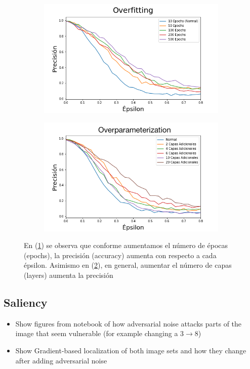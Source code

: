 \begin{figure}[h]
    \centering
    \begin{subfigure}[b]{0.49\textwidth}
        \centering
        \includegraphics[width=\textwidth]{images/overfit_vs_attack.png}
        \caption{}
        \label{overfit}
    \end{subfigure}
    \begin{subfigure}[b]{0.49\textwidth}
        \centering
        \includegraphics[width=\textwidth]{images/overparam_vs_attack.png}
        \caption{}
        \label{overparam}
    \end{subfigure}
    \caption{En (\ref{overfit}) se observa que conforme aumentamos el número de épocas (epochs), la precisión (accuracy) aumenta con respecto a cada épsilon. Asimismo en (\ref{overparam}), en general, aumentar el número de capas (layers) aumenta la precisión}
    \label{overaparam_overfit}
\end{figure}

\pagebreak
    
\subsection{Saliency}
\begin{itemize}
    \item Show figures from notebook of how adversarial noise attacks parts of the image that seem vulnerable (for example changing a 3$\to$8)
    \item Show Gradient-based localization of both image sets and how they change after adding adversarial noise\cite{Selvaraju_2019}
\end{itemize}

